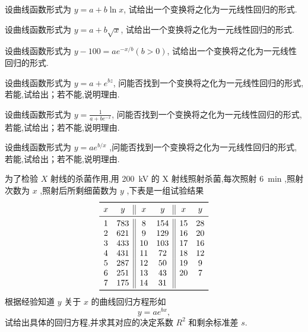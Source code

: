 \begin{xiti}
    \item 设曲线函数形式为 $y = a + b \ln x$, 试给出一个变换将之化为一元线性回归的形式.
    \item 设曲线函数形式为 $y = a + b \sqrt{x}$, 试给出一个变换将之化为一元线性回归的形式.
    \item 设曲线函数形式为 $y - 100 = a e^{-x/b} (b > 0)$, 试给出一个变换将之化为一元线性回归的形式.
    \item 设曲线函数形式为 $y = a + e^{bz}$, 问能否找到一个变换将之化为一元线性回归的形式,若能,试给出；若不能,说明理由.
    \item 设曲线函数形式为 $\displaystyle y = \frac{1}{a + be^{-x}}$, 问能否找到一个变换将之化为一元线性回归的形式,若能,试给出；若不能,说明理由.
    \item 设曲线函数形式为 $y = a e^{b/x}$ ,问能否找到一个变换将之化为一元线性回归的形式,若能,试给出；若不能,说明理由.
    \item 为了检验 $X$ 射线的杀菌作用,用 \SI{200}{\kV} 的 X 射线照射杀菌,每次照射 \SI{6}{\minute} ,照射次数为 $x$ ,照射后所剩细菌数为 $y$ ,下表是一组试验结果
    \begin{equation*}
    \begin{array}{cc||cc||cc}
  \toprule
    x     & y     & x     & y     & x     & y \\
  \midrule
    1     & 783   & 8     & 154   & 15    & 28 \\
    2     & 621   & 9     & 129   & 16    & 20 \\
    3     & 433   & 10    & 103   & 17    & 16 \\
    4     & 431   & 11    & 72    & 18    & 12 \\
    5     & 287   & 12    & 50    & 19    & 9  \\
    6     & 251   & 13    & 43    & 20    & 7  \\
    7     & 175   & 14    & 31    &       &    \\
  \bottomrule
    \end{array}%
    \end{equation*}
    根据经验知道 $y$ 关于 $x$ 的曲线回归方程形如 
    \begin{equation*}
      y=ae^{bx}, 
    \end{equation*}
    试给出具体的回归方程,并求其对应的决定系数 $R^2$ 和剩余标准差 $s$.
\end{xiti}